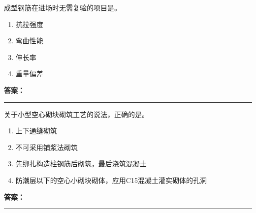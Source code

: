 \documentclass[UTF8,fontset=fandol,11pt]{ctexart}
\newcommand{\answerline}{\textcolor{answerred}{\rule{2.4cm}{0.7pt}}}
\begin{document}
\begin{quizbox}[title={乱序第 99 题｜第四章混凝土结构工程}]

成型钢筋在进场时无需复验的项目是。\\

\begin{enumerate}[label=\Alph*.]

\item 抗拉强度

\item 弯曲性能

\item 伸长率

\item 重量偏差

\end{enumerate}

\textbf{\textcolor{answerred}{答案：}} \answerline

\end{quizbox}

\vspace{0.2em}

\begin{quizbox}[title={乱序第 100 题｜第六章砌筑工程}]

关于小型空心砌块砌筑工艺的说法，正确的是。\\

\begin{enumerate}[label=\Alph*.]

\item 上下通缝砌筑

\item 不可采用铺浆法砌筑

\item 先绑扎构造柱钢筋后砌筑，最后浇筑混凝土

\item 防潮层以下的空心小砌块砌体，应用C15混凝土灌实砌体的孔洞

\end{enumerate}

\textbf{\textcolor{answerred}{答案：}} \answerline

\end{quizbox}

\vspace{0.2em}
\end{document}
